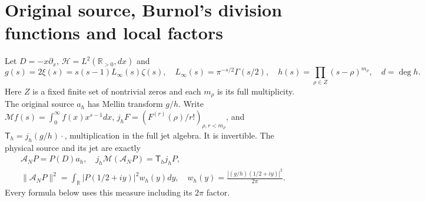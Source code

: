 \section{Original source, Burnol's division functions and local factors}
Let $D=-x\partial_x$, $\mathcal H=L^2(\mathbb R_{>0},dx)$ and
\[
 g(s)=2\xi(s)=s(s-1)L_\infty(s)\zeta(s),\quad
 L_\infty(s)=\pi^{-s/2}\Gamma(s/2),\quad
 h(s)=\prod_{\rho\in Z}(s-\rho)^{m_\rho},\quad d=\deg h.\tag{LR1}
\]
Here $Z$ is a fixed finite set of nontrivial zeros and each $m_\rho$ is
its full multiplicity. The original source $a_h$ has Mellin transform
$g/h$. Write $\mathcal M f(s)=\int_0^\infty f(x)x^{s-1}dx$,
$j_hF=(F^{(r)}(\rho)/r!)_{\rho,r<m_\rho}$, and
$\mathsf T_h=j_h(g/h)\cdot$, multiplication in the full jet algebra.
It is invertible. The physical source and its jet are exactly
\[
 \begin{gathered}
 \mathcal A_NP=P(D)a_h,\quad j_h\mathcal M(\mathcal A_NP)
 =\mathsf T_hj_hP,\\
 \|\mathcal A_NP\|^2=\int_{\mathbb R}|P(1/2+iy)|^2w_h(y)dy,
 \quad w_h(y)=\frac{|(g/h)(1/2+iy)|^2}{2\pi}.
 \end{gathered}\tag{LR2}
\]
Every formula below uses this measure including its $2\pi$ factor.


